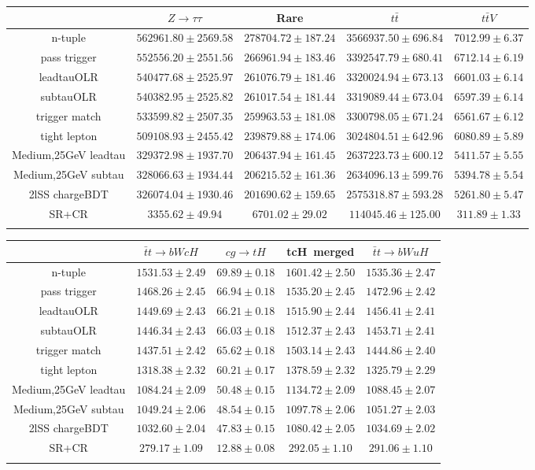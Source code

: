 \begin{tabular}{ccccc} \toprule\toprule
 & $Z\to \tau\tau$ & Rare & $t\bar{t}$ & $t\bar{t}V$\\\midrule
n-tuple & $562961.80\pm2569.58$ & $278704.72\pm187.24$ & $3566937.50\pm696.84$ & $7012.99\pm6.37$\\
pass trigger & $552556.20\pm2551.56$ & $266961.94\pm183.46$ & $3392547.79\pm680.41$ & $6712.14\pm6.19$\\
leadtauOLR & $540477.68\pm2525.97$ & $261076.79\pm181.46$ & $3320024.94\pm673.13$ & $6601.03\pm6.14$\\
subtauOLR & $540382.95\pm2525.82$ & $261017.54\pm181.44$ & $3319089.44\pm673.04$ & $6597.39\pm6.14$\\
trigger match & $533599.82\pm2507.35$ & $259963.53\pm181.08$ & $3300798.05\pm671.24$ & $6561.67\pm6.12$\\
tight lepton & $509108.93\pm2455.42$ & $239879.88\pm174.06$ & $3024804.51\pm642.96$ & $6080.89\pm5.89$\\
Medium,25GeV leadtau & $329372.98\pm1937.70$ & $206437.94\pm161.45$ & $2637223.73\pm600.12$ & $5411.57\pm5.55$\\
Medium,25GeV subtau & $328066.63\pm1934.44$ & $206215.52\pm161.36$ & $2634096.13\pm599.76$ & $5394.78\pm5.54$\\
2lSS chargeBDT & $326074.04\pm1930.46$ & $201690.62\pm159.65$ & $2575318.87\pm593.28$ & $5261.80\pm5.47$\\
SR+CR & $3355.62\pm49.94$ & $6701.02\pm29.02$ & $114045.46\pm125.00$ & $311.89\pm1.33$\\
\bottomrule\bottomrule\\
\end{tabular}
\begin{tabular}{ccccc} \toprule\toprule
 & $\bar{t}t\to bWcH$ & $cg\to tH$ & tcH~merged & $\bar{t}t\to bWuH$\\\midrule
n-tuple & $1531.53\pm2.49$ & $69.89\pm0.18$ & $1601.42\pm2.50$ & $1535.36\pm2.47$\\
pass trigger & $1468.26\pm2.45$ & $66.94\pm0.18$ & $1535.20\pm2.45$ & $1472.96\pm2.42$\\
leadtauOLR & $1449.69\pm2.43$ & $66.21\pm0.18$ & $1515.90\pm2.44$ & $1456.41\pm2.41$\\
subtauOLR & $1446.34\pm2.43$ & $66.03\pm0.18$ & $1512.37\pm2.43$ & $1453.71\pm2.41$\\
trigger match & $1437.51\pm2.42$ & $65.62\pm0.18$ & $1503.14\pm2.43$ & $1444.86\pm2.40$\\
tight lepton & $1318.38\pm2.32$ & $60.21\pm0.17$ & $1378.59\pm2.32$ & $1325.79\pm2.29$\\
Medium,25GeV leadtau & $1084.24\pm2.09$ & $50.48\pm0.15$ & $1134.72\pm2.09$ & $1088.45\pm2.07$\\
Medium,25GeV subtau & $1049.24\pm2.06$ & $48.54\pm0.15$ & $1097.78\pm2.06$ & $1051.27\pm2.03$\\
2lSS chargeBDT & $1032.60\pm2.04$ & $47.83\pm0.15$ & $1080.42\pm2.05$ & $1034.69\pm2.02$\\
SR+CR & $279.17\pm1.09$ & $12.88\pm0.08$ & $292.05\pm1.10$ & $291.06\pm1.10$\\
\bottomrule\bottomrule\\
\end{tabular}
